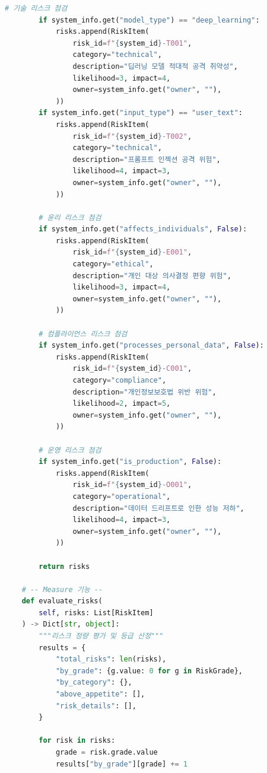 \begin{lstlisting}[language=Python, caption={NIST AI RMF 기반 리스크 자동 평가 엔진}, label={lst:risk_engine}]
        # 기술 리스크 점검
        if system_info.get("model_type") == "deep_learning":
            risks.append(RiskItem(
                risk_id=f"{system_id}-T001",
                category="technical",
                description="딥러닝 모델 적대적 공격 취약성",
                likelihood=3, impact=4,
                owner=system_info.get("owner", ""),
            ))
        if system_info.get("input_type") == "user_text":
            risks.append(RiskItem(
                risk_id=f"{system_id}-T002",
                category="technical",
                description="프롬프트 인젝션 공격 위험",
                likelihood=4, impact=3,
                owner=system_info.get("owner", ""),
            ))

        # 윤리 리스크 점검
        if system_info.get("affects_individuals", False):
            risks.append(RiskItem(
                risk_id=f"{system_id}-E001",
                category="ethical",
                description="개인 대상 의사결정 편향 위험",
                likelihood=3, impact=4,
                owner=system_info.get("owner", ""),
            ))

        # 컴플라이언스 리스크 점검
        if system_info.get("processes_personal_data", False):
            risks.append(RiskItem(
                risk_id=f"{system_id}-C001",
                category="compliance",
                description="개인정보보호법 위반 위험",
                likelihood=2, impact=5,
                owner=system_info.get("owner", ""),
            ))

        # 운영 리스크 점검
        if system_info.get("is_production", False):
            risks.append(RiskItem(
                risk_id=f"{system_id}-O001",
                category="operational",
                description="데이터 드리프트로 인한 성능 저하",
                likelihood=4, impact=3,
                owner=system_info.get("owner", ""),
            ))

        return risks

    # -- Measure 기능 --
    def evaluate_risks(
        self, risks: List[RiskItem]
    ) -> Dict[str, object]:
        """리스크 정량 평가 및 등급 산정"""
        results = {
            "total_risks": len(risks),
            "by_grade": {g.value: 0 for g in RiskGrade},
            "by_category": {},
            "above_appetite": [],
            "risk_details": [],
        }

        for risk in risks:
            grade = risk.grade.value
            results["by_grade"][grade] += 1


\end{lstlisting}
